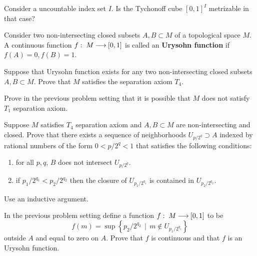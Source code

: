 \documentclass[12pt]{article}
\begin{document}
\begin{zadacha}[*] 
  Consider a uncountable index set $I$. Is the Tychonoff cube
  $[0,1]^I$ metrizable in that case?
\end{zadacha}


\begin{opredelenie}
Consider two non-intersecting closed subsets $A, B\subset M$ of a
topological space $M$. A continuous function  $f:\; M {\:\longrightarrow\:}
[0,1]$ is called an {\bf Urysohn function} if $f(A)=0, f(B)=1$.
\end{opredelenie}

\begin{zadacha}
  Suppose that Urysohn function exists for any two non-intersecting
  closed subsets $A, B\subset M$. Prove that $M$ satisfies the
  separation axiom $T_4$.
\end{zadacha}

\begin{zadacha}
Prove in the previous problem setting that it is possible that $M$
does not satisfy $T_1$ separation axiom.
\end{zadacha}

\begin{zadacha}[*]
Suppose $M$ satisfies $T_4$ separation axiom and $A, B\subset M$ are
non-intersecting and closed. 
Prove that there exists a sequence of neighborhoods 
$U_{p/2^q}\supset A$ indexed by rational numbers of the form
$0<p/2^q<1$ that satisfies the following conditions:
\begin{enumerate}
\renewcommand{\labelenumi}{(\roman{enumi})}
\item for all $p,q$, $B$ does not intersect $U_{p/2^q}$.

\item if $p_1/2^{q_1}< p_2/2^{q_2}$ then the closure of
  $U_{p_1/2^{q_1}}$ is contained in $U_{p_2/2^{q_2}}$.
\end{enumerate}
\end{zadacha}

\begin{ukazanie}
Use an inductive argument.
\end{ukazanie}

\begin{zadacha}[*]
In the previous problem setting define a function $f:\; M {\:\longrightarrow\:}
[0,1]$ to be 
\[  
f(m) = \sup \left\{ p_2/2^{q_2} \ \ | \ \ m\notin U_{p_1/2^{q_1}}\right\}
\]
outside $A$ and equal to zero on $A$.
Prove that $f$ is continuous and that $f$ is an Urysohn function.
\end{zadacha}
\end{document}
